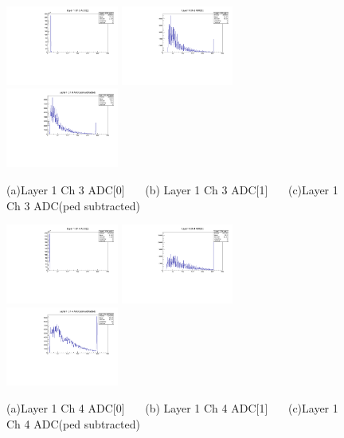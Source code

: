 \documentclass[a4paper,11pt]{article}
\theoremstyle{mytheor}
\begin{document}
\begin{figure}[H] 
\vspace*{-0.3cm} 
\includegraphics[width=0.33\textwidth,scale=0.5,trim=0 0 0 0,clip]{plotsdir/file0_test-Layer1_Ch3_adc0-1.pdf} 
\includegraphics[width=0.33\textwidth,scale=0.5,trim=0 0 0 0,clip]{plotsdir/file0_test-Layer1_Ch3_adc1-1.pdf} 
\includegraphics[width=0.33\textwidth,scale=0.5,trim=0 0 0 0,clip]{plotsdir/file0_test-Layer1_Ch3_adcPedsub-1.pdf} 
\caption{(a)Layer 1 Ch 3 ADC[0] ~~~(b) Layer 1 Ch 3 ADC[1] ~~~(c)Layer 1 Ch 3 ADC(ped subtracted) } 
\end{figure} 
\begin{figure}[H] 
\vspace*{-0.3cm} 
\includegraphics[width=0.33\textwidth,scale=0.5,trim=0 0 0 0,clip]{plotsdir/file0_test-Layer1_Ch4_adc0-1.pdf} 
\includegraphics[width=0.33\textwidth,scale=0.5,trim=0 0 0 0,clip]{plotsdir/file0_test-Layer1_Ch4_adc1-1.pdf} 
\includegraphics[width=0.33\textwidth,scale=0.5,trim=0 0 0 0,clip]{plotsdir/file0_test-Layer1_Ch4_adcPedsub-1.pdf} 
\caption{(a)Layer 1 Ch 4 ADC[0] ~~~(b) Layer 1 Ch 4 ADC[1] ~~~(c)Layer 1 Ch 4 ADC(ped subtracted) } 
\end{figure} 
\end{document}
